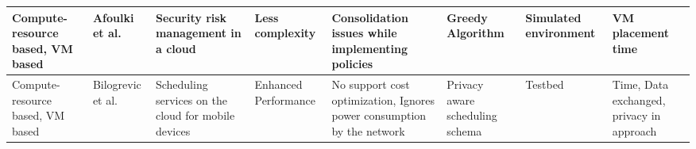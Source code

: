 \begin{sidewaystable*}[!htbp]
{\begin{tabular}{|g{2cm} p{2cm} p{2cm} p{2cm} p{2cm} p{2cm} p{2cm} p{1.9cm}|}
Compute-resource based, VM based & Afoulki et al.~\cite{afoulki2011security}& Security risk management in a cloud &  Less complexity & Consolidation issues while implementing policies & Greedy Algorithm & Simulated environment & VM placement time  
\\ \hline 

Compute-resource based, VM based & Bilogrevic et al.~\cite{bilogrevic2011meetings} & Scheduling services on the cloud for mobile devices & Enhanced Performance & No support cost optimization, Ignores power consumption by the network & Privacy aware scheduling schema & Testbed & Time, Data exchanged, privacy in approach 
 \\ \hline
\end{tabular}
}

\end{sidewaystable*}
